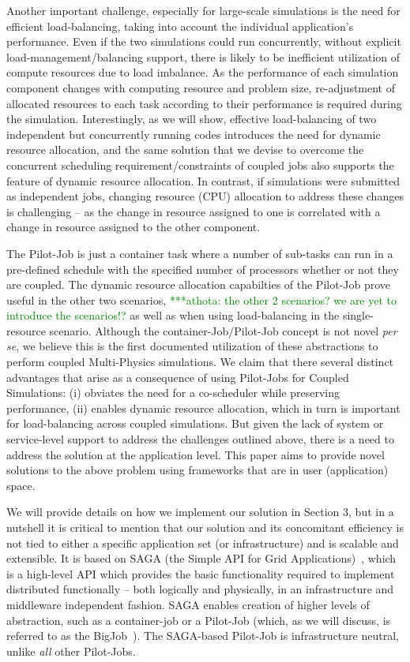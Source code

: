 \documentclass[conference,final]{IEEEtran}
\newcommand{\athotanote}[1]{ {\textcolor{green} { ***athota: #1 }}}
\begin{document}
Another important challenge, especially for large-scale simulations is
the need for efficient load-balancing, taking into account the
individual application's performance. Even if the two simulations could
run concurrently, without explicit load-management/balancing support,
there is likely to be inefficient utilization of compute resources due
to load imbalance. As the performance of each simulation component
changes with computing resource and problem size, re-adjustment of
allocated resources to each task according to their performance is
required during the simulation. Interestingly, as we will show,
effective load-balancing of two independent but concurrently running
codes introduces the need for dynamic resource allocation, and the
same solution that we devise to overcome the concurrent scheduling
requirement/constraints of coupled jobs also supports the feature of
dynamic resource allocation. In contrast, if simulations were
submitted as independent jobs, changing resource (CPU) allocation to
address these changes is challenging -- as the change in resource
assigned to one is correlated with a change in resource assigned to
the other component.

The Pilot-Job is just a container task where a number of sub-tasks can
run in a pre-defined schedule with the specified number of processors
whether or not they are coupled.  The dynamic resource allocation
capabilties of the Pilot-Job prove useful in the other two scenarios,\athotanote{ the other 2 scenarios? we are yet to introduce the scenarios!?}
as well as when using load-balancing in the single-resource scenario.
Although the container-Job/Pilot-Job concept is not novel {\it per
  se}, we believe this is the first documented utilization of these
abstractions to perform coupled Multi-Physics simulations. We claim
that there several distinct advantages that arise as a consequence of
using Pilot-Jobs for Coupled Simulations: (i) obviates the need for a
co-scheduler while preserving performance, (ii) enables dynamic
resource allocation, which in turn is important for load-balancing
across coupled simulations.  But given the lack of system or
service-level support to address the challenges outlined above, there
is a need to address the solution at the application level. This paper
aims to provide novel solutions to the above problem using frameworks
that are in user (application) space.
 
We will provide details on how we implement our solution in Section 3,
but in a nutshell it is critical to mention that our solution and its
concomitant efficiency is not tied to either a specific application
set (or infrastructure) and is scalable and extensible. It is based
on SAGA (the Simple API for Grid Applications)~\cite{saga_web},
which is a high-level API which provides the basic functionality
required to implement distributed functionally -- both logically and
physically, in an infrastructure and middleware independent
fashion. SAGA enables creation of higher levels of abstraction,
such as a container-job or a Pilot-Job (which, as we will discuss, is
referred to as the BigJob~\cite{saga_royalsoc}). The SAGA-based
Pilot-Job is infrastructure neutral, unlike {\it all} other
Pilot-Jobs.
\end{document}
